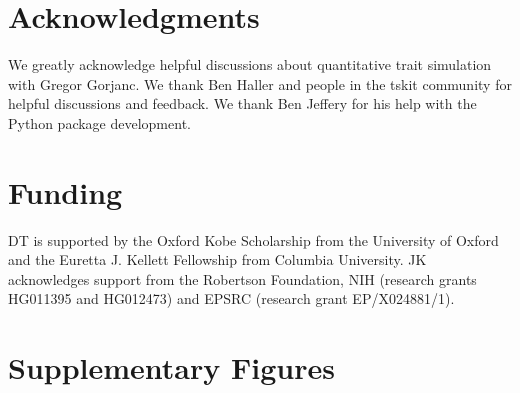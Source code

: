 \documentclass[unnumsec,webpdf,modern,large,namedate]{oup-authoring-template}%
\begin{document}
\section{Acknowledgments}

We greatly acknowledge helpful discussions about quantitative trait simulation
with Gregor Gorjanc. We thank Ben Haller and people in the tskit community for
helpful discussions and feedback. We thank Ben Jeffery for his help with the
Python package development.

\section{Funding}
DT is supported by the Oxford Kobe Scholarship from the University of Oxford
and the Euretta J. Kellett Fellowship from Columbia University.
JK acknowledges support from the Robertson Foundation,
NIH (research grants HG011395 and HG012473) and
EPSRC (research grant EP/X024881/1).





\newpage
\renewcommand\thefigure{S\arabic{figure}}
\setcounter{figure}{0}
\renewcommand\thetable{S\arabic{table}}
\setcounter{table}{0}
\section{Supplementary Figures}
\end{document}

